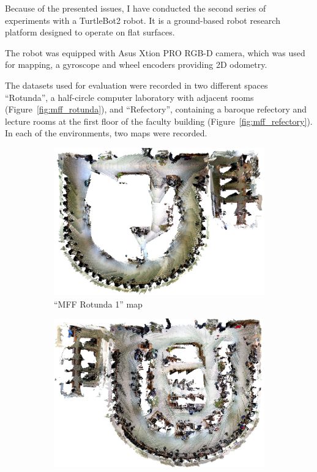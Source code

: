 Because of the presented issues, I have conducted the second series of experiments with a TurtleBot2 robot. It is a ground-based robot research platform designed to operate on flat surfaces.

The robot was equipped with Asus Xtion PRO \gls{RGB-D} camera, which was used for mapping, a gyroscope and wheel encoders providing \gls{2D} odometry.

The datasets used for evaluation were recorded in two different spaces ``Rotunda'', a half-circle computer laboratory with adjacent rooms (Figure~\ref{fig:mff_rotunda}), and ``Refectory'', containing a baroque refectory and lecture rooms at the first floor of the faculty building (Figure~\ref{fig:mff_refectory}). In each of the environments, two maps were recorded.

\begin{figure}
    \centering
    \begin{subfigure}[b]{\textwidth}
        \includegraphics[width=\textwidth]{../img/mff_rotunda_1.png}
        \caption{``MFF Rotunda 1'' map}
    \end{subfigure}
    \begin{subfigure}[b]{\textwidth}
        \includegraphics[width=\textwidth]{../img/mff_rotunda_2.png}

\end{subfigure}
\end{figure}
